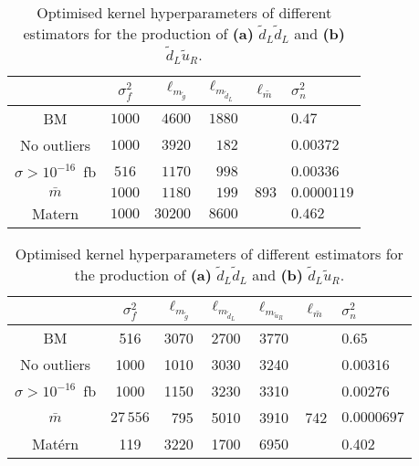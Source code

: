 \documentclass[twoside,english]{uiofysmaster}
\begin{document}
{{\begin{table}
\begin{subtable}{\textwidth}
\centering
\begin{tabular}{@{}ccrrrl@{}} \toprule
 & $\sigma_f^2$ & $\ell_{m_{\widetilde{g}}}$ & $\ell_{m_{\widetilde{d}_L}}$ & $\ell_{\bar{m}}$ & $\sigma_n^2$\\ \midrule
BM & $1000$ & $4600 $& $ 1880$ & & $0.47$\\
No outliers & $1000$ & $3920$ & $182$ & & $0.00372$\\
$\sigma > 10^{-16}$~fb & $516$ & $1170$&  $998$ && $0.00336$\\
$\bar{m}$ & $1000$ & $1180$ & $199$ & $893$ & $0.0000119$\\
Matern & $1000$ & $30200$ & $8600$ && $0.462$\\ \bottomrule
\end{tabular}
\caption{$\widetilde{d}_L \widetilde{d}_L$}
\label{Tab:: evaluating cross : optimal kernels dLdL}
\end{subtable}

\begin{subtable}{\textwidth}
\centering
\begin{tabular}{@{}ccrrrrl@{}} \toprule
 & $\sigma_f^2$ & $\ell_{m_{\widetilde{g}}}$ & $\ell_{m_{\widetilde{d}_L}}$ & $\ell_{m_{\widetilde{u}_R}}$ & $\ell_{\bar{m}}$ &$\sigma_n^2$\\ \midrule
BM & 516 & 3070 & 2700 & 3770 && 0.65 \\
No outliers &  1000 & 1010 & 3030 & 3240&& 0.00316\\ 
$\sigma > 10^{-16}$~fb & 1000 &1150  & 3230& 3310&& 0.00276 \\
$\bar{m}$ & $27\,556$ & 795&5010 &3910 & 742 & $0.0000697$\\
Mat\'{e}rn & 119 & 3220  &1700 & 6950 && 0.402\\ \bottomrule
\end{tabular}
\caption{$\widetilde{d}_L \widetilde{u}_R$}
\label{Tab:: evaluating cross : optimal kernels dLuR}
\end{subtable}

\caption{Optimised kernel hyperparameters of different estimators for the production of \textbf{(a)} $\widetilde{d}_L \widetilde{d}_L$ and \textbf{(b)} $\widetilde{d}_L \widetilde{u}_R$.}
\end{table}

}}
\end{document}
